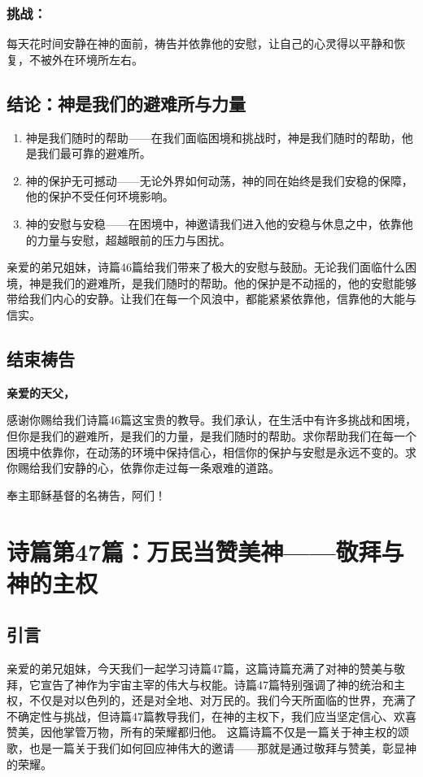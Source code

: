 \documentclass[a4paper, 12pt]{article}
\begin{document}
\subsubsection*{挑战：}

每天花时间安静在神的面前，祷告并依靠他的安慰，让自己的心灵得以平静和恢复，不被外在环境所左右。
\subsection*{结论：神是我们的避难所与力量}
\begin{enumerate}
    \item 神是我们随时的帮助——在我们面临困境和挑战时，神是我们随时的帮助，他是我们最可靠的避难所。

    \item 神的保护无可撼动——无论外界如何动荡，神的同在始终是我们安稳的保障，他的保护不受任何环境影响。

    \item 神的安慰与安稳——在困境中，神邀请我们进入他的安稳与休息之中，依靠他的力量与安慰，超越眼前的压力与困扰。

\end{enumerate}

亲爱的弟兄姐妹，诗篇46篇给我们带来了极大的安慰与鼓励。无论我们面临什么困境，神是我们的避难所，是我们随时的帮助。他的保护是不动摇的，他的安慰能够带给我们内心的安静。让我们在每一个风浪中，都能紧紧依靠他，信靠他的大能与信实。

\subsection*{结束祷告}
\textbf{亲爱的天父，}

感谢你赐给我们诗篇46篇这宝贵的教导。我们承认，在生活中有许多挑战和困境，但你是我们的避难所，是我们的力量，是我们随时的帮助。求你帮助我们在每一个困境中依靠你，在动荡的环境中保持信心，相信你的保护与安慰是永远不变的。求你赐给我们安静的心，依靠你走过每一条艰难的道路。

奉主耶稣基督的名祷告，阿们！
\newpage
\section{诗篇第47篇：万民当赞美神——敬拜与神的主权}
\subsection*{引言}
亲爱的弟兄姐妹，今天我们一起学习诗篇47篇，这篇诗篇充满了对神的赞美与敬拜，它宣告了神作为宇宙主宰的伟大与权能。诗篇47篇特别强调了神的统治和主权，不仅是对以色列的，还是对全地、对万民的。我们今天所面临的世界，充满了不确定性与挑战，但诗篇47篇教导我们，在神的主权下，我们应当坚定信心、欢喜赞美，因他掌管万物，所有的荣耀都归他。
这篇诗篇不仅是一篇关于神主权的颂歌，也是一篇关于我们如何回应神伟大的邀请——那就是通过敬拜与赞美，彰显神的荣耀。
\end{document}
